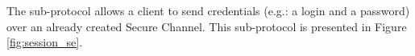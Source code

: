 %
%
%
%                
%                
%                
%                
%
%


The  sub-protocol allows a client to send credentials
(e.g.: a login and a password) over an already created Secure Channel.
This sub-protocol is presented in Figure \ref{fig:session_se}.

